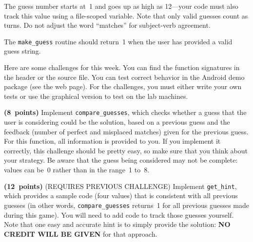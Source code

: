 The guess number starts at~1 and goes up as high as 12---your code
must also track this value using a file-scoped variable.  Note that
only valid guesses count as turns.  Do not adjust the word ``matches''
for subject-verb agreement.

The {\tt make\_guess} routine should return~1 when the user has provided
a valid guess string.\\


\pagebreak


Here are some challenges for this week.  You can find the function
signatures in the header or the source file.  You can test correct
behavior in the Android demo package (see the web page).  For the
challenges, you must
either write your own tests or use the graphical version to test
on the lab machines.

\begin{list}{x}{\setlength{\leftmargin}{1.25in}\setlength{\rightmargin}{0.5in}\setlength{\labelwidth}{.75in}\setlength{\itemsep}{0pt}\setlength{\parskip}{0pt}\setlength{\parsep}{0pt}}
\item[{\bf (8~points)}]{Implement {\tt compare\_guesses}, which
checks whether a guess that the user is considering could be the
solution, based on a previous guess and the feedback (number of
perfect and misplaced matches) given for the previous guess.
For this function, all information is provided to you.  If you
implement it correctly, this challenge should be pretty easy,
so make sure that you think about your strategy.  Be aware that
the guess being considered may not be complete: values can be~0
rather than in the range~1 to~8.}
\item[{\bf (12~points)}]{(REQUIRES PREVIOUS CHALLENGE)
Implement {\tt get\_hint}, which
provides a sample code (four values) that is consistent
with all previous guesses (in other words, {\tt compare\_guesses}
returns~1 for all previous guesses made during this game).
You will need to add code to track those guesses yourself.
Note that one easy and accurate hint is to simply provide the
solution: {\bf NO CREDIT WILL BE GIVEN} for that approach.}
\end{list}\vspace{-12pt}


\vspace{4pt}

